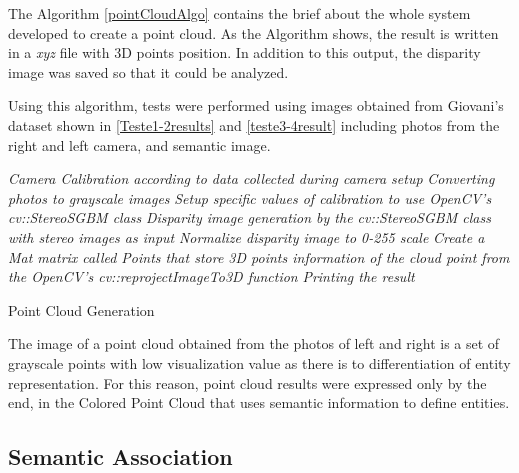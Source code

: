    The Algorithm \autoref{pointCloudAlgo} contains the brief about the whole system developed to create a point cloud. As the Algorithm shows, the result is written in a \textit{xyz} file with 3D points position. In addition to this output, the disparity image was saved so that it could be analyzed.
    
    Using this algorithm, tests were performed using images obtained from Giovani's dataset \cite{giovaniThesis} shown in \autoref{Teste1-2results} and \autoref{teste3-4result} including photos from the right and left camera, and semantic image.

\IncMargin{1em}
\begin{algorithm}
\label{pointCloudAlgo}
\BlankLine
\emph{Camera Calibration according to data collected during camera setup}\;
\emph{Converting photos to grayscale images}\;
\emph{Setup specific values of calibration to use OpenCV's cv::StereoSGBM class}\;
\emph{Disparity image generation by the cv::StereoSGBM class with stereo images as input}\;
\emph{Normalize disparity image to 0-255 scale}\;
\emph{Create a Mat matrix called Points that store 3D points information of the cloud point from the OpenCV's cv::reprojectImageTo3D function}\;    
\emph{Printing the result}\;
\caption{Point Cloud Generation}\label{algo_disjdecomp}
\end{algorithm}\DecMargin{1em}

    The image of a point cloud obtained from the photos of left and right is a set of grayscale points with low visualization value as there is to differentiation of entity representation. For this reason, point cloud results were expressed only by the end, in the Colored Point Cloud that uses semantic information to define entities.
    
\subsection{Semantic Association}


